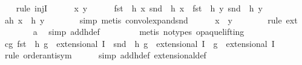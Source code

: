 \begin{isabellebody}
\ \ \isamarkupfalse%
\ {\isacharparenleft}{\kern0pt}rule\ injI{\isacharparenright}{\kern0pt}\isanewline
\ \ \ \ \isamarkupfalse%
\ x\ y\isanewline
\ \ \ \ \isamarkupfalse%
\ {\isachardoublequoteopen}{\isacharparenleft}{\kern0pt}fst\ {\isasymcirc}\ h\ x{\isacharcomma}{\kern0pt}\ snd\ {\isasymcirc}\ h\ x{\isacharparenright}{\kern0pt}\ {\isacharequal}{\kern0pt}\ {\isacharparenleft}{\kern0pt}fst\ {\isasymcirc}\ h\ y{\isacharcomma}{\kern0pt}\ snd\ {\isasymcirc}\ h\ y{\isacharparenright}{\kern0pt}{\isachardoublequoteclose}\isanewline
\ \ \ \ \isamarkupfalse%
\ a{}{\isacharcolon}{\kern0pt}{\isachardoublequoteopen}h\ x\ {\isacharequal}{\kern0pt}\ h\ y{\isachardoublequoteclose}\isanewline
\ \ \ \ \ \ \isamarkupfalse%
\ {\isacharparenleft}{\kern0pt}simp{\isacharcomma}{\kern0pt}\ metis\ convol{\isacharunderscore}{\kern0pt}expand{\isacharunderscore}{\kern0pt}snd{\isacharparenright}{\kern0pt}\isanewline
\ \ \ \ \isamarkupfalse%
\ {\isachardoublequoteopen}x\ {\isacharequal}{\kern0pt}\ y{\isachardoublequoteclose}\isanewline
\ \ \ \ \ \ \isamarkupfalse%
\ {\isacharparenleft}{\kern0pt}rule\ ext{\isacharparenright}{\kern0pt}\isanewline
\ \ \ \ \ \ \isamarkupfalse%
\ a{}\ \isamarkupfalse%
\ {\isacharparenleft}{\kern0pt}simp\ add{\isacharcolon}{\kern0pt}h{\isacharunderscore}{\kern0pt}def{\isacharparenright}{\kern0pt}\ \isanewline
\ \ \ \ \ \ \isamarkupfalse%
\ {\isacharparenleft}{\kern0pt}metis\ {\isacharparenleft}{\kern0pt}no{\isacharunderscore}{\kern0pt}types{\isacharcomma}{\kern0pt}\ opaque{\isacharunderscore}{\kern0pt}lifting{\isacharparenright}{\kern0pt}{\isacharparenright}{\kern0pt}\isanewline
\ \ \isamarkupfalse%
\isanewline
\isanewline
\ \ \isamarkupfalse%
\ c{\isacharcolon}{\kern0pt}{\isachardoublequoteopen}{\isasymAnd}g{\isachardot}{\kern0pt}\ {\isacharparenleft}{\kern0pt}fst\ {\isasymcirc}\ h\ g\ {\isasymin}\ extensional\ I\ {\isasymand}\ snd\ {\isasymcirc}\ h\ g\ {\isasymin}\ extensional\ I{\isacharparenright}{\kern0pt}\ {\isacharequal}{\kern0pt}\ {\isacharparenleft}{\kern0pt}g\ {\isasymin}\ extensional\ I{\isacharparenright}{\kern0pt}{\isachardoublequoteclose}\ \isanewline
\ \ \ \ \isamarkupfalse%
\ {\isacharparenleft}{\kern0pt}rule\ order{\isacharunderscore}{\kern0pt}antisym{\isacharparenright}{\kern0pt}\isanewline
\ \ \ \ \isamarkupfalse%
\ {\isacharparenleft}{\kern0pt}simp\ add{\isacharcolon}{\kern0pt}h{\isacharunderscore}{\kern0pt}def\ extensional{\isacharunderscore}{\kern0pt}def{\isacharparenright}{\kern0pt}\ \isanewline

\end{isabellebody}

